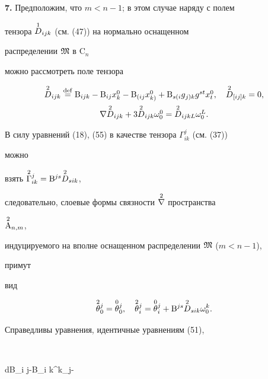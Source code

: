  


{\bf 7.} Предположим, что $m<n-1$; в этом случае наряду с полем 


тензора $\overset{1}{D}{}_{i j k}$ (см. (47)) на нормально оснащенном 


распределении $\frak M$ в $\mathrm C_n$ 


можно рассмотреть поле тензора 


\begin{equation} 


\begin{array}{c} 


\up{2}{D}_{i j k}\eqdef \mathrm B_{i j k}-\mathrm B_{i j} 


x^0_k-\mathrm B{}_{(i j}x{}^0_{k)}+\mathrm B{}_{s(i} 


g{}_{j)k}g^{s t}x^0_t,\quad \up{2}{D}_{[i j]k}=0,\\[2mm] 


\nabla\up{2}{D}_{i j k}+3\up{2}{D}_{i j k}\omega^0_0= 


\up{2}{D}_{i j k L}\omega^L_0. 


\end{array} 


\end{equation} 


В силу уравнений (18), (55) в качестве тензора $\Gamma^j_{i k}$ (см. (37)) 


можно 


взять $\overset{2}{\Gamma}{}^j_{i k}=\mathrm B^{j s}\overset{2}{D}{}_{s i k}$, 


следовательно, слоевые формы связности $\overset{2}{\nabla}{}$ пространства 


$\overset{2}{\mathrm A}{}_{n,m}$, 


индуцируемого на вполне оснащенном распределении $\frak M$ ($m<n-1$), 


примут 


вид 


$$ 


\up{2}{\theta}^j_0=\up{0}{\theta}^j_0,\quad 


\up{2}{\theta}^j_i=\up{0}{\theta}^j_i+\mathrm B^{j s} 


\up{2}{D}_{s i k}\omega^k_0. 


$$ 


 


Справедливы уравнения, идентичные уравнениям (51), 


$$ 


d\mathrm B_{i j}-\mathrm B_{i k}^k_j- 


